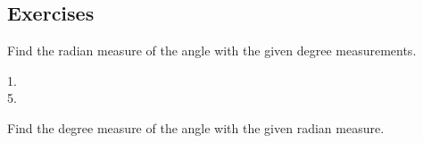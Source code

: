 \subsection{Exercises}

Find the radian measure of the angle with the given degree measurements. 


\begin{description}
\item [1.]   
\columnsep =30pt
 

\item [5.]
\columnsep =30pt
 \end{description}

Find the degree measure of the angle with the given radian measure. 


